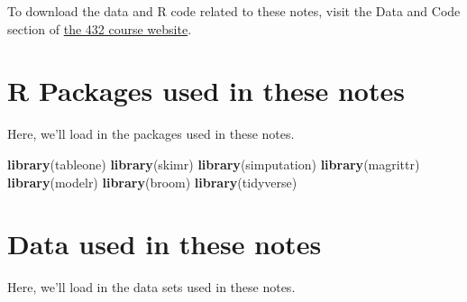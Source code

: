 \documentclass[]{book}
\newenvironment{Shaded}{\begin{snugshade}}{\end{snugshade}}
\newcommand{\KeywordTok}[1]{\textcolor[rgb]{0.13,0.29,0.53}{\textbf{#1}}}
\newcommand{\StringTok}[1]{\textcolor[rgb]{0.31,0.60,0.02}{#1}}
\newcommand{\OperatorTok}[1]{\textcolor[rgb]{0.81,0.36,0.00}{\textbf{#1}}}
\newcommand{\NormalTok}[1]{#1}
\theoremstyle{definition}
\theoremstyle{definition}
\theoremstyle{definition}
\theoremstyle{remark}
\begin{document}
To download the data and R code related to these notes, visit the Data
and Code section of \href{https://github.com/THOMASELOVE/432-2018}{the
432 course website}.

\chapter*{R Packages used in these
notes}\label{r-packages-used-in-these-notes}

Here, we'll load in the packages used in these notes.

\begin{Shaded}
\begin{Highlighting}[]
\KeywordTok{library}\NormalTok{(tableone)}
\KeywordTok{library}\NormalTok{(skimr)}
\KeywordTok{library}\NormalTok{(simputation)}
\KeywordTok{library}\NormalTok{(magrittr)}
\KeywordTok{library}\NormalTok{(modelr)}
\KeywordTok{library}\NormalTok{(broom)}
\KeywordTok{library}\NormalTok{(tidyverse)}
\end{Highlighting}
\end{Shaded}

\chapter*{Data used in these notes}\label{data-used-in-these-notes}

Here, we'll load in the data sets used in these notes.

\begin{Shaded}
\end{Shaded}
\end{document}
